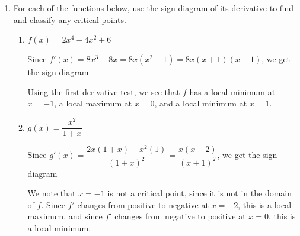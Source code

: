 \documentclass[12pt]{article}
\begin{document}
\thispagestyle{fancy}

 \begin{enumerate}
  \item For each of the functions below, use the sign diagram of its derivative to find and classify any critical points.
\begin{enumerate}
 \item $f(x) = 2x^4-4x^2+6$

\bigskip

Since $f'(x) = 8x^3-8x=8x(x^2-1)=8x(x+1)(x-1)$, we get the sign diagram
\begin{center}
\end{center}

Using the first derivative test, we see that $f$ has a local minimum at $x=-1$, a local maximum at $x=0$, and a local minimum at $x=1$.

\bigskip

 \item $g(x) = \dfrac{x^2}{1+x}$

\bigskip

Since $g'(x) = \dfrac{2x(1+x)-x^2(1)}{(1+x)^2} = \dfrac{x(x+2)}{(x+1)^2}$, we get the sign diagram
\begin{center}
\end{center}
We note that $x=-1$ is not a critical point, since it is not in the domain of $f$. Since $f'$ changes from positive to negative at $x=-2$, this is a local maximum, and since $f'$ changes from negative to positive at $x=0$, this is a local minimum.


\end{enumerate}
\end{enumerate}
\end{document}
